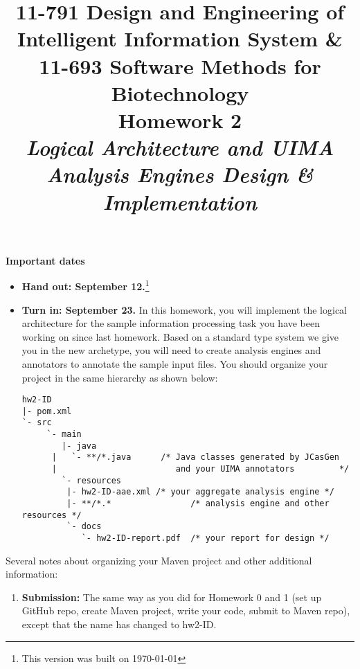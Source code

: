 \documentclass[oneside]{memoir}
\title{{\bfseries 11-791 Design and Engineering of Intelligent Information
System \& \\11-693 Software Methods for Biotechnology \\Homework 2}\\
\vspace{1em}
\itshape\rmfamily Logical Architecture and UIMA Analysis Engines Design \&
Implementation}
\date{}
\begin{document}
\begin{titlingpage}
\maketitle

\hspace{-0.1\textwidth}
\begin{minipage}{1.2\textwidth}
\vspace{-5em}
\textbf{Important dates}
\begin{itemize}

\item \textbf{Hand out: September 12.}\footnote{This version was built on \today}

\item \textbf{Turn in: September 23.} In this homework, you will implement the
logical architecture for the sample information processing task you have been
working on since last homework. Based on a standard type system we give you in
the new archetype, you will need to create analysis engines and annotators to
annotate the sample input files. You should organize your project in the same
hierarchy as shown below:

\small
\begin{verbatim}
hw2-ID
|- pom.xml
`- src
     `- main
        |- java
      |   `- **/*.java      /* Java classes generated by JCasGen
      |                        and your UIMA annotators         */ 
        `- resources
         |- hw2-ID-aae.xml /* your aggregate analysis engine */
         |- **/*.*                /* analysis engine and other resources */
         `- docs
            `- hw2-ID-report.pdf  /* your report for design */

\end{verbatim}
\normalsize

\end{itemize}

\end{minipage}
\hspace{-0.1\textwidth}

\hspace{-0.1\textwidth}
\begin{minipage}{1.2\textwidth}

Several notes about organizing your Maven project and other additional
information:

\begin{enumerate}

\item \textbf{Submission:} The same way as you did for Homework 0 and 1 (set up
GitHub repo, create Maven project, write your code, submit to Maven repo),
except that the name has changed to hw2-ID.


\end{enumerate}
\end{minipage}
\end{titlingpage}
\end{document}
